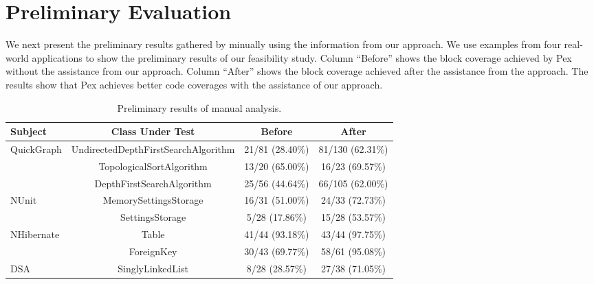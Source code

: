 \section{Preliminary Evaluation}
\label{sec:prelims}

We next present the preliminary results gathered by minually using the information from our approach. We use examples
from four real-world applications to show the preliminary results of our feasibility study. Column ``Before'' shows the block coverage achieved 
by Pex without the assistance from our approach. Column ``After'' shows the block coverage achieved after the assistance from the approach.
The results show that Pex achieves better code coverages with the assistance of our approach.

\begin{table*}[t]
\begin{SmallOut}
\begin{CodeOut}
\begin{center}
\centering \caption {\label{tab:results} Preliminary results of manual analysis.}
\begin {tabular} {|l|c|c|c|}
\hline
Subject & Class Under Test & Before & After\\
\hline
\hline QuickGraph & UndirectedDepthFirstSearchAlgorithm & 21/81 (28.40\%) & 81/130 (62.31\%)\\
\hline 						& TopologicalSortAlgorithm 						& 13/20 (65.00\%) & 16/23  (69.57\%)\\
\hline						&	DepthFirstSearchAlgorithm						& 25/56 (44.64\%) & 66/105 (62.00\%)\\
\hline NUnit		  & MemorySettingsStorage								& 16/31 (51.00\%) & 24/33  (72.73\%)\\
\hline						& SettingsStorage											& 5/28  (17.86\%) & 15/28  (53.57\%)\\
\hline NHibernate & Table																& 41/44 (93.18\%) & 43/44  (97.75\%)\\
\hline						& ForeignKey 													& 30/43 (69.77\%) & 58/61  (95.08\%)\\
\hline DSA			  & SinglyLinkedList									  & 8/28  (28.57\%) & 27/38  (71.05\%)\\
\hline
\end{tabular}
\end{center}
\end{CodeOut}
\end{SmallOut}\vspace*{-6ex}
\end{table*}


